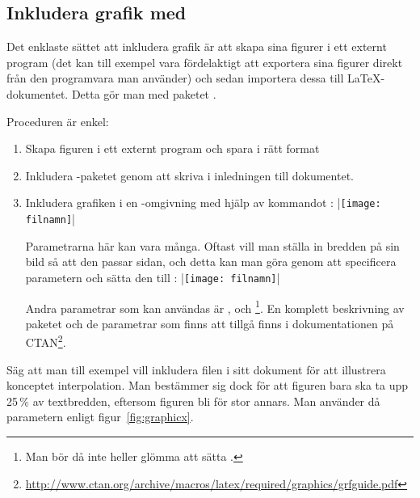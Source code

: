 \documentclass[../../a4.tex]{subfiles}
\begin{document}
\subsection{Inkludera grafik med }
Det enklaste sättet att inkludera grafik är att skapa sina figurer i ett
externt program (det kan till exempel vara fördelaktigt att exportera sina
figurer direkt från den programvara man använder) och sedan importera
dessa till \LaTeX{}-dokumentet. Detta gör man med paketet .

Proceduren är enkel:
\begin{enumerate}
	\item Skapa figuren i ett externt program och spara i rätt format
	
	\item Inkludera -paketet genom att skriva
	 i inledningen till dokumentet.
	
	\item Inkludera grafiken i en -omgivning med hjälp av
	kommandot :
	\latex|\texttt{[image: filnamn]}|
	
	Parametrarna här kan vara många. Oftast vill man ställa in bredden på
	sin bild så att den passar sidan, och detta kan man göra genom att
	specificera parametern  och sätta den till
	:
	\latex|\texttt{[image: filnamn]}|
	
	Andra parametrar som kan användas är , 
	och \footnote{Man bör då inte heller glömma att sätta
	.\hfil}. En komplett beskrivning av paketet och de 
	parametrar som finns att tillgå finns i dokumentationen på
	CTAN\footnote{\url{http://www.ctan.org/archive/macros/latex/required/graphics/grfguide.pdf}}.
\end{enumerate}

Säg att man till exempel vill inkludera filen 
i sitt dokument för att illustrera konceptet interpolation. Man bestämmer
sig dock för att figuren bara ska ta upp 25\,\% av textbredden, eftersom
figuren bli för stor annars. Man använder då parametern 
enligt figur~\vref{fig:graphicx}.%
\end{document}
